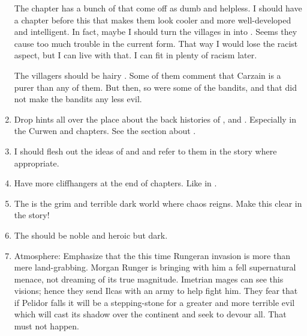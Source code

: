 \begin{enumerate}
    The chapter  has a bunch of \scathae that come off as dumb and helpless. 
    I should have a chapter before this that makes them look cooler and more well-developed and intelligent.
    In fact, maybe I should turn the villages in  into \humans.
    Seems they cause too much trouble in the current form. 
    That way I would lose the racist aspect, but I can live with that. 
    I can fit in plenty of racism later.
    
    The villagers should be hairy \demihumans.
    Some of them comment that Carzain is a purer \human than any of them. 
    But then, so were some of the bandits, and that did not make the bandits any less evil. 
    
  
  \item 
    Drop hints all over the place about the back histories of \dragons, \resphain and \banes.
    Especially in the Curwen and \Cobrel chapters. 
    See the section about . 
  
  \item 
    I should flesh out the ideas of \sephirah {} and \qliphah {} and refer to them in the story where appropriate. 
  
  \item 
    Have more cliffhangers at the end of chapters. 
    Like in \cite{AdrianTchaikovsky:ShadowsoftheApt}. 
   
  \item
    The \wylde is the grim and terrible dark world where chaos reigns. 
    Make this clear in the story!

  \item
    The \resphain should be noble and heroic but dark.
  
  \item
    Atmosphere: 
    Emphasize  that the this time Rungeran invasion is more than mere land-grabbing. 
    Morgan Runger is bringing with him a fell supernatural menace, not dreaming of its true magnitude. 
    Imetrian mages can see this visions; hence they send Ilcas with an army to help fight him. 
    They fear that if Pelidor falls it will be a stepping-stone for a greater and more terrible evil which will cast its shadow over the continent and seek to devour all.
    That must not happen.
\end{enumerate}





